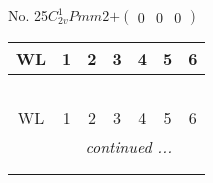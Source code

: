 \documentclass[fleqn,9pt,landscape]{jsarticle}
\begin{document}
\newpage
No. 25\quad$C_{2v}^{1}$\quad$Pmm2$\quad[ orthorhombic ]\quad$+\begin{pmatrix} 0 & 0 & 0 \end{pmatrix}$
\begin{center}
\renewcommand{\arraystretch}{1.2}
\begin{longtable}{ccccccc}
 \hline \hline
WL & 1 & 2 & 3 & 4 & 5 & 6 \\ \hline \endfirsthead

\multicolumn{6}{l}{\tablename\ \thetable{}} \\
 \hline \hline
WL & 1 & 2 & 3 & 4 & 5 & 6 \\ \hline \endhead

 \hline \hline
\multicolumn{6}{r}{\footnotesize\it continued ...} \\ \endfoot

 \hline \hline
\multicolumn{6}{r}{} \\ \endlastfoot


\end{longtable}
\end{center}
\end{document}
